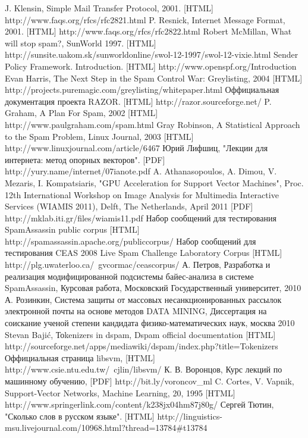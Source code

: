 \newpage
\begin{thebibliography}{99}
 J. Klensin, Simple Mail Transfer Protocol, 2001. [HTML] http://www.faqs.org/rfcs/rfc2821.html 
 P. Resnick, Internet Message Format, 2001. [HTML] http://www.faqs.org/rfcs/rfc2822.html
 Robert McMillan, What will stop spam?, SunWorld 1997. [HTML] http://sunsite.uakom.sk/sunworldonline/swol-12-1997/swol-12-vixie.html
 Sender Policy Framework. Introduction.  [HTML] http://www.openspf.org/Introduction
 Evan Harris, The Next Step in the Spam Control War: Greylisting, 2004 [HTML] http://projects.puremagic.com/greylisting/whitepaper.html
 Оффициальная документация проекта RAZOR. [HTML] http://razor.sourceforge.net/
 P. Graham, A Plan For Spam, 2002 [HTML] http://www.paulgraham.com/spam.html
 Gray Robinson, A Statistical Approach to the Spam Problem, Linux Journal, 2003 [HTML] http://www.linuxjournal.com/article/6467 
 Юрий Лифшиц, "Лекции для интернета: метод опорных векторов". [PDF] http://yury.name/internet/07ianote.pdf
A. Athanasopoulos, A. Dimou, V. Mezaris, I. Kompatsiaris, "GPU Acceleration for Support Vector Machines", Proc. 12th International Workshop on Image Analysis for Multimedia Interactive Services (WIAMIS 2011), Delft, The Netherlands, April 2011 [PDF] http://mklab.iti.gr/files/wiamis11.pdf
 Набор сообщений для тестирования SpamAssassin public corpus [HTML] http://spamassassin.apache.org/publiccorpus/
 Набор сообщений для тестирования CEAS 2008 Live Spam Challenge Laboratory Corpus [HTML] http://plg.uwaterloo.ca/~gvcormac/ceascorpus/
 А. Петров, Разработка и реализация модифицированной подсистемы байес-анализа в системе SpamAssassin, Курсовая работа, Московский Государственный университет, 2010
 А. Розинкин, Система защиты от массовых несанкционированных рассылок электронной почты на основе методов DATA MINING, Диссертация на соискание ученой степени кандидата физико-математических наук, москва 2010 
 Stevan Bajić, Тоkenizers in dspam, Dspam official documentation [HTML] http://sourceforge.net/apps/mediawiki/dspam/index.php?title=Tokenizers
Оффициальная страница libsvm, [HTML] http://www.csie.ntu.edu.tw/~cjlin/libsvm/
 К. В. Воронцов, Курс лекций по машинному обучению, [PDF] http://bit.ly/voroncov\_ml 
 C. Cortes, V. Vapnik, Support-Vector Networks, Machine Learning, 20, 1995 [HTML] http://www.springerlink.com/content/k238jx04hm87j80g/
Сергей Тютин, "Сколько слов в русском языке". [HTML] http://linguistics-msu.livejournal.com/10968.html?thread=13784\#t13784
\end{thebibliography}
